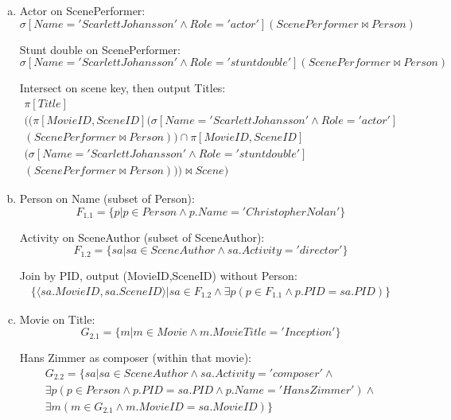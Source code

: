 \documentclass{article}
\begin{document}
\begin{enumerate}[(a)]
\item
Actor on ScenePerformer:
\begin{equation}
\sigma\left[Name='Scarlett Johansson' \land Role='actor'\right](ScenePerformer \Join Person)
\end{equation}

Stunt double on ScenePerformer:
\begin{equation}
\sigma\left[Name='Scarlett Johansson' \land Role='stunt double'\right](ScenePerformer \Join Person)
\end{equation}

Intersect on scene key, then output Titles:
\begin{multline}
\pi\left[Title\right]\\
 ((\pi\left[MovieID,SceneID\right](\sigma\left[Name='Scarlett Johansson' \land Role='actor'\right]\\
 (ScenePerformer \Join Person)) \cap \pi\left[MovieID,SceneID\right]\\
 (\sigma\left[Name='Scarlett Johansson' \land Role='stunt double'\right]\\
 (ScenePerformer \Join Person))) \Join Scene)
\end{multline}

\item
Person on Name (subset of Person):
\begin{equation}
F_{1.1} = \{p | p \in Person \land p.Name='Christopher Nolan' \}
\end{equation}

Activity on SceneAuthor (subset of SceneAuthor):
\begin{equation}
F_{1.2} = \{sa | sa \in SceneAuthor \land sa.Activity='director' \}
\end{equation}

Join by PID, output (MovieID,SceneID) without Person:
\begin{multline}
\{\langle sa.MovieID, sa.SceneID \rangle | sa \in F_{1.2} \land \exists p(p \in F_{1.1} \land p.PID = sa.PID)\}
\end{multline}

\item
Movie on Title:
\begin{equation}
G_{2.1} = \{m | m \in Movie \land m.MovieTitle='Inception'\}
\end{equation}

Hans Zimmer as composer (within that movie):
\begin{multline}
G_{2.2} = \{sa | sa \in SceneAuthor \land sa.Activity='composer' \land \\
\exists p(p \in Person \land p.PID=sa.PID \land p.Name='Hans Zimmer') \land \\
\exists m(m \in G_{2.1} \land m.MovieID=sa.MovieID)\}
\end{multline}


\end{enumerate}
\end{document}
